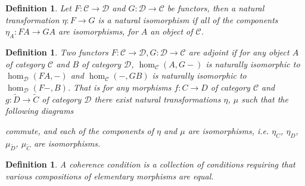 \documentclass[11pt]{report}
\newcommand{\mcC}{\mathcal{C}}
\newcommand{\mcD}{\mathcal{D}}
\newtheorem{defn}[thm]{Definition} %
\begin{document}
\begin{defn}
Let $F: \mcC \to \mcD$ and $G: \mcD \to \mcC$ be functors, then a natural transformation $\eta: F \to G$ is a natural isomorphism if all of the components $\eta_A:FA \to GA$ are isomorphisms, for $A$ an object of $\mcC$.
\end{defn}


\begin{defn}
  Two functors $F: \mcC \to \mcD, G: \mcD \to \mcC$ are adjoint if for any object $A$ of category $\mcC$ and $B$ of category $\mcD$,
  $\hom_{\mcC}(A,G-)$ is naturally isomorphic to $\hom_{\mcD}(FA,-)$ and $\hom_{\mcC}(-,GB)$ is naturally isomorphic to  $\hom_{\mcD}(F-,B)$.
  That is for any morphisms $f:C \to D$ of category $\mcC$ and $g: \widetilde{D} \to \widetilde{C}$ of category $\mcD$ there exist natural transformations $\eta$, $\mu$ such that the following diagrams
  \begin{center}
  \end{center}
  \begin{center}
\end{center}
  commute, and each of the components of $\eta$ and $\mu$ are isomorphisms, i.e. $\eta_C$, $\eta_D$, $\mu_{\widetilde{D}}$, $\mu_{\widetilde{C}}$ are isomorphisms.
\end{defn}
\begin{defn}
  A coherence condition is a collection of conditions requiring that various compositions of elementary morphisms are equal. 
\end{defn}
\end{document}
